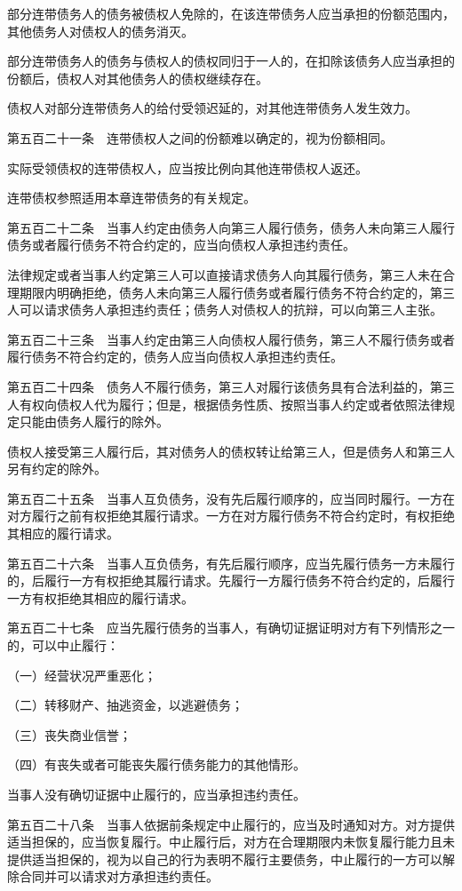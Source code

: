 \documentclass[UTF8,12pt,a4paper]{ctexbook}
\begin{document}
部分连带债务人的债务被债权人免除的，在该连带债务人应当承担的份额范围内，其他债务人对债权人的债务消灭。

部分连带债务人的债务与债权人的债权同归于一人的，在扣除该债务人应当承担的份额后，债权人对其他债务人的债权继续存在。

债权人对部分连带债务人的给付受领迟延的，对其他连带债务人发生效力。

第五百二十一条　连带债权人之间的份额难以确定的，视为份额相同。

实际受领债权的连带债权人，应当按比例向其他连带债权人返还。

连带债权参照适用本章连带债务的有关规定。

第五百二十二条　当事人约定由债务人向第三人履行债务，债务人未向第三人履行债务或者履行债务不符合约定的，应当向债权人承担违约责任。

法律规定或者当事人约定第三人可以直接请求债务人向其履行债务，第三人未在合理期限内明确拒绝，债务人未向第三人履行债务或者履行债务不符合约定的，第三人可以请求债务人承担违约责任；债务人对债权人的抗辩，可以向第三人主张。

第五百二十三条　当事人约定由第三人向债权人履行债务，第三人不履行债务或者履行债务不符合约定的，债务人应当向债权人承担违约责任。

第五百二十四条　债务人不履行债务，第三人对履行该债务具有合法利益的，第三人有权向债权人代为履行；但是，根据债务性质、按照当事人约定或者依照法律规定只能由债务人履行的除外。

债权人接受第三人履行后，其对债务人的债权转让给第三人，但是债务人和第三人另有约定的除外。

第五百二十五条　当事人互负债务，没有先后履行顺序的，应当同时履行。一方在对方履行之前有权拒绝其履行请求。一方在对方履行债务不符合约定时，有权拒绝其相应的履行请求。

第五百二十六条　当事人互负债务，有先后履行顺序，应当先履行债务一方未履行的，后履行一方有权拒绝其履行请求。先履行一方履行债务不符合约定的，后履行一方有权拒绝其相应的履行请求。

第五百二十七条　应当先履行债务的当事人，有确切证据证明对方有下列情形之一的，可以中止履行：

（一）经营状况严重恶化；

（二）转移财产、抽逃资金，以逃避债务；

（三）丧失商业信誉；

（四）有丧失或者可能丧失履行债务能力的其他情形。

当事人没有确切证据中止履行的，应当承担违约责任。

第五百二十八条　当事人依据前条规定中止履行的，应当及时通知对方。对方提供适当担保的，应当恢复履行。中止履行后，对方在合理期限内未恢复履行能力且未提供适当担保的，视为以自己的行为表明不履行主要债务，中止履行的一方可以解除合同并可以请求对方承担违约责任。
\end{document}
